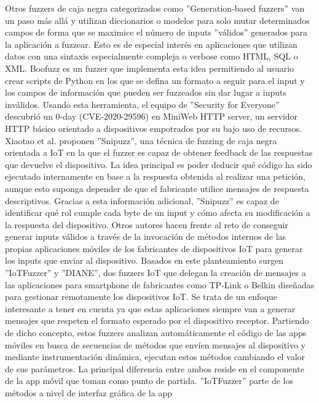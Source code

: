 Otros fuzzers de caja negra categorizados 
como ''Generation-based fuzzers''\cite{Felderer2016} van un paso más allá y utilizan diccionarios o modelos para solo 
mutar determinados campos de forma que se maximice el número de inputs ''válidos'' generados para la aplicación a fuzzear. Esto es de 
especial interés en aplicaciones que utilizan datos con una sintaxis especialmente compleja o verbose como HTML, SQL o XML.
Boofuzz\cite{boofuzz} es un fuzzer que implementa esta idea permitiendo al usuario crear scripts de Python en los que 
se defina un formato a seguir para el input y los campos de información que pueden ser fuzzeados sin dar lugar a inputs 
inválidos. Usando esta herramienta, el equipo de ''Security for Everyone'' descubrió un 0-day (CVE-2020-29596)\cite{securityforeveryone}
en MiniWeb HTTP server, un servidor HTTP básico orientado a dispositivos empotrados por su bajo uso de recursos.
Xiaotao et al.\cite{snipuzz} proponen ''Snipuzz'', una técnica de fuzzing de caja negra orientada a IoT en la que el fuzzer es capaz de obtener feedback 
de las respuestas que devuelve el dispositivo. La idea principal es poder deducir qué código ha sido ejecutado internamente en base a 
la respuesta obtenida al realizar una petición, aunque esto suponga depender de que el fabricante utilice mensajes de respuesta descriptivos.
Gracias a esta información adicional, ''Snipuzz'' es capaz de identificar qué rol cumple cada 
byte de un input y cómo afecta su modificación a la respuesta del dispositivo. Otros autores hacen frente al reto de conseguir generar inputs 
válidos a través de la invocación de métodos internos de las propias aplicaciones móviles de los fabricantes de dispositivos IoT para generar los 
inputs que enviar al dispositivo.
Basados en este planteamiento surgen ''IoTFuzzer''\cite{Chen2018} y ''DIANE''\cite{Redini2021}, dos fuzzers IoT que delegan la creación de mensajes 
a las aplicaciones para smartphone de fabricantes como TP-Link o Belkin diseñadas para gestionar remotamente los dispositivos IoT. 
Se trata de un enfoque interesante a tener en cuenta ya que estas aplicaciones siempre van a generar mensajes que respeten el formato esperado
por el dispositivo receptor. Partiendo de dicho concepto, estos fuzzers analizan automáticamente el código de las apps móviles en busca de secuencias de 
métodos que envíen mensajes al dispositivo y mediante instrumentación dinámica, ejecutan estos métodos cambiando el valor de sus parámetros. La principal diferencia 
entre ambos reside en el componente de la app móvil que toman como punto de partida. ''IoTFuzzer'' parte de los métodos a nivel de interfaz gráfica de la app
